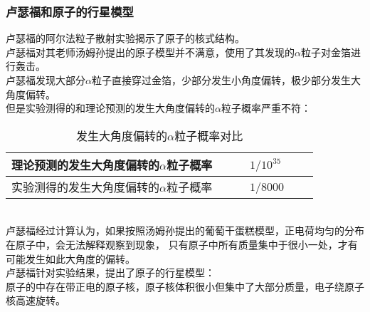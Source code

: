 \documentclass[UTF8]{ctexart}
\begin{document}
\subsubsection{卢瑟福和原子的行星模型}
    卢瑟福的阿尔法粒子散射实验揭示了原子的核式结构。\\[3mm]
    卢瑟福对其老师汤姆孙提出的原子模型并不满意，使用了其发现的$\alpha$粒子对金箔进行轰击。\\[3mm]
    卢瑟福发现大部分$\alpha$粒子直接穿过金箔，少部分发生小角度偏转，极少部分发生大角度偏转。\\[3mm]
    但是实验测得的和理论预测的发生大角度偏转的$\alpha$粒子概率严重不符：
    \begin{table}[h]
        \begin{center}
            \begin{tabular}{l|l}
                \hline
                理论预测的发生大角度偏转的$\alpha$粒子概率~~~~&$1/10^{35}$~~~~\\ \hline
                实验测得的发生大角度偏转的$\alpha$粒子概率~~~~&$1/8000$~~~~\\ \hline
            \end{tabular}
            \caption{发生大角度偏转的$\alpha$粒子概率对比}
        \end{center}
    \end{table}\\
    卢瑟福经过计算认为，如果按照汤姆孙提出的葡萄干蛋糕模型，正电荷均匀的分布在原子中，会无法解释观察到现象，
    只有原子中所有质量集中于很小一处，才有可能发生如此大角度的偏转。\\[3mm]
    卢瑟福针对实验结果，提出了原子的行星模型：\\[3mm]
    原子的中存在带正电的原子核，原子核体积很小但集中了大部分质量，电子绕原子核高速旋转。

\newpage
\end{document}
